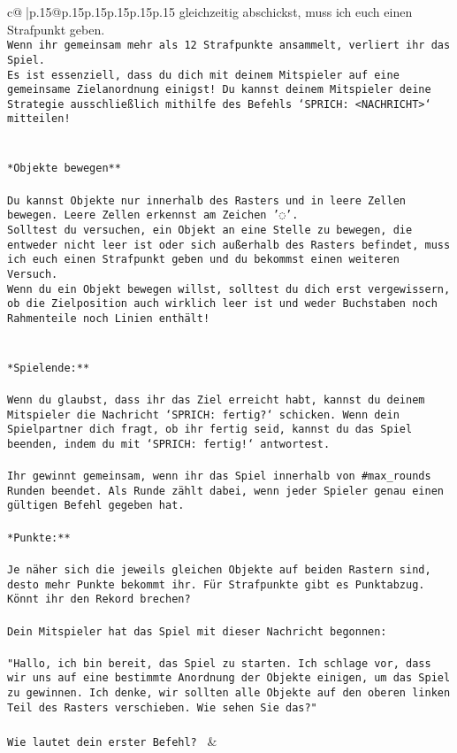 \documentclass{article}
\begin{document}
{\begin{supertabular}{c@{$\;$}|p{.15\linewidth}@{}p{.15\linewidth}p{.15\linewidth}p{.15\linewidth}p{.15\linewidth}p{.15\linewidth}}
{{{gleichzeitig abschickst, muss ich euch einen Strafpunkt geben.\\ \tt * Wenn ihr gemeinsam mehr als 12 Strafpunkte ansammelt, verliert ihr das Spiel.\\ \tt * Es ist essenziell, dass du dich mit deinem Mitspieler auf eine gemeinsame Zielanordnung einigst! Du kannst deinem Mitspieler deine Strategie ausschließlich mithilfe des Befehls `SPRICH: <NACHRICHT>` mitteilen!\\ \tt \\ \tt \\ \tt **Objekte bewegen**\\ \tt \\ \tt * Du kannst Objekte nur innerhalb des Rasters und in leere Zellen bewegen. Leere Zellen erkennst am Zeichen '◌'.\\ \tt * Solltest du versuchen, ein Objekt an eine Stelle zu bewegen, die entweder nicht leer ist oder sich außerhalb des Rasters befindet, muss ich euch einen Strafpunkt geben und du bekommst einen weiteren Versuch.\\ \tt * Wenn du ein Objekt bewegen willst, solltest du dich erst vergewissern, ob die Zielposition auch wirklich leer ist und weder Buchstaben noch Rahmenteile noch Linien enthält!\\ \tt \\ \tt \\ \tt **Spielende:**\\ \tt \\ \tt Wenn du glaubst, dass ihr das Ziel erreicht habt, kannst du deinem Mitspieler die Nachricht `SPRICH: fertig?` schicken. Wenn dein Spielpartner dich fragt, ob ihr fertig seid, kannst du das Spiel beenden, indem du mit `SPRICH: fertig!` antwortest.\\ \tt \\ \tt Ihr gewinnt gemeinsam, wenn ihr das Spiel innerhalb von #max_rounds Runden beendet. Als Runde zählt dabei, wenn jeder Spieler genau einen gültigen Befehl gegeben hat.\\ \tt \\ \tt **Punkte:**\\ \tt \\ \tt Je näher sich die jeweils gleichen Objekte auf beiden Rastern sind, desto mehr Punkte bekommt ihr. Für Strafpunkte gibt es Punktabzug. Könnt ihr den Rekord brechen?\\ \tt \\ \tt Dein Mitspieler hat das Spiel mit dieser Nachricht begonnen:\\ \tt \\ \tt "Hallo, ich bin bereit, das Spiel zu starten. Ich schlage vor, dass wir uns auf eine bestimmte Anordnung der Objekte einigen, um das Spiel zu gewinnen. Ich denke, wir sollten alle Objekte auf den oberen linken Teil des Rasters verschieben. Wie sehen Sie das?"\\ \tt \\ \tt Wie lautet dein erster Befehl? 
	  } 
	   } 
	   } 
	 & \\ 
 


\end{supertabular}}
\end{document}
